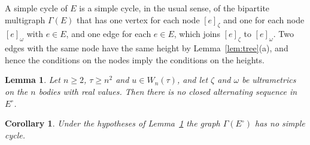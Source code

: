 \documentclass[11pt]{amsart}
\newtheorem{lemma}[theorem]{Lemma}
\newtheorem{corollary}[theorem]{Corollary}
\theoremstyle{definition}
\theoremstyle{remark}
\numberwithin{equation}{section}
\newcommand{\Eo}{E^{\circ}}
\newcommand{\nd}[2]{[#1]_{#2}}
\begin{document}
A simple cycle of $E$ is a simple cycle, in the usual sense, of the bipartite multigraph $\Gamma(E)$
that has one vertex for each node $\nd{e}{\zeta}$ and one for each node $\nd{e}{\omega}$ with
$e \in E$, and one edge for each $e \in E$, which joins $\nd{e}{\zeta}$ to $\nd{e}{\omega}$. Two edges
with the same node have the same height by Lemma~\ref{lem:tree}(a), and hence the conditions on the
nodes imply the conditions on the heights.

\begin{lemma}\label{lem:C}
Let $n \ge 2$, $\tau \ge n^2$ and $u \in W_n(\tau)$, and let $\zeta$ and $\omega$ be ultrametrics on
the $n$ bodies with real values. Then there is no closed alternating sequence in $\Eo$.
\end{lemma}

\begin{corollary}\label{cor:C}
Under the hypotheses of Lemma~\ref{lem:C} the graph $\Gamma(\Eo)$ has no simple cycle.
\end{corollary}
\end{document}
